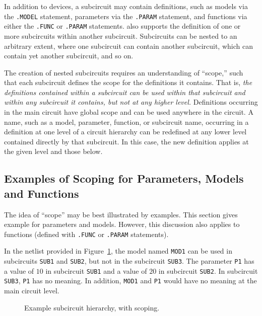 In addition to devices, a subcircuit may contain definitions, such as models
via the \texttt{.MODEL} statement, parameters via the \texttt{.PARAM}
statement, and functions via either the \texttt{.FUNC} or \texttt{.PARAM} statements.  
\Xyce{} also supports the definition of one or more subcircuits within another subcircuit.
 Subcircuits can be nested to an arbitrary extent,
where one subcircuit can contain another subcircuit, which can contain yet
another subcircuit, and so on.

The creation of nested subcircuits requires an understanding of ``scope,''
 such that each subcircuit defines the scope for the
definitions it contains.  That is, {\em the definitions contained within a
subcircuit can be used within that subcircuit and within any subcircuit it
contains, but not at any higher level.}  Definitions occurring in the main
circuit have global scope and can be used anywhere in the circuit.  A name,
such as a model, parameter, function, or subcircuit name, occurring in a
definition at one level of a circuit hierarchy can be redefined at any lower
level contained directly by that subcircuit.  In this case, the new definition
applies at the given level and those below.

\subsection{Examples of Scoping for Parameters, Models and Functions}
The idea of ``scope'' may be best illustrated by examples.  This section gives
example for parameters and models.  However, this discussion also applies to
functions (defined with \texttt{.FUNC} or \texttt{.PARAM} statements). 

In the netlist provided
in Figure~\ref{Subcircuit_Example_2}, the model named \texttt{MOD1} can be used
in subcircuits \texttt{SUB1} and \texttt{SUB2}, but not in the subcircuit
\texttt{SUB3}. The parameter \texttt{P1} has a value of $10$ in subcircuit
\texttt{SUB1} and a value of $20$ in subcircuit \texttt{SUB2}. In subcircuit
\texttt{SUB3}, \texttt{P1} has no meaning.  In addition, \texttt{MOD1}
and \texttt{P1} would have no meaning at the main circuit level.

\begin{figure}[H]
\begin{centering}
\caption{Example subcircuit hierarchy, with scoping.\label{Subcircuit_Example_2}}
\end{centering}
\end{figure}

